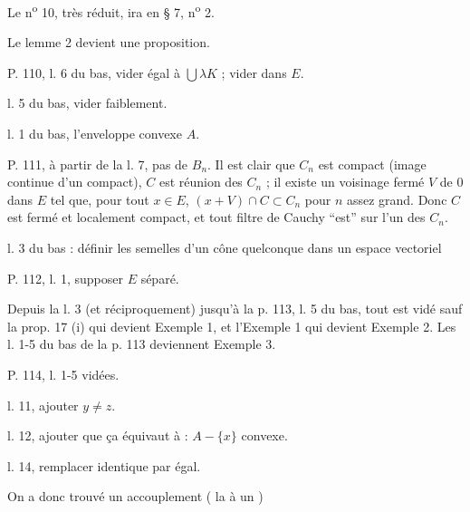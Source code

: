 Le n\textsuperscript{o} 10, très réduit, ira en § 7, n\textsuperscript{o} 2.

Le lemme 2 devient une proposition.

P. 110, l. 6 du bas, vider égal à $\bigcup\lambda K$ ; vider dans $E$.

l. 5 du bas, vider faiblement.

l. 1 du bas, l'enveloppe convexe $A$.

P. 111, à partir de la l. 7, pas de $B_n$. Il est clair que $C_n$ est compact (image continue d'un compact), $C$ est réunion des $C_n$ ; il existe un voisinage fermé $V$ de $0$ dans $E$ tel que, pour tout $x\in E$, $(x+V)\cap C\subset C_n$ pour $n$ assez grand. Donc $C$ est fermé et localement compact, et tout filtre de Cauchy ``est'' sur l'un des $C_n$.

l. 3 du bas : définir les semelles d'un cône quelconque dans un espace vectoriel

P. 112, l. 1, supposer $E$ séparé.

Depuis la l. 3 (et réciproquement) jusqu'à la p. 113, l. 5 du bas, tout est vidé sauf la prop. 17 (i) qui devient Exemple 1, et l'Exemple 1 qui devient Exemple 2.
Les l. 1-5 du bas de la p. 113 deviennent Exemple 3.

P. 114, l. 1-5 vidées.

l. 11, ajouter $y\ne z$.

l. 12, ajouter que ça équivaut à : $A-\{x\}$ convexe.

l. 14, remplacer identique par égal.

On a donc trouvé un accouplement (  la  à un )

